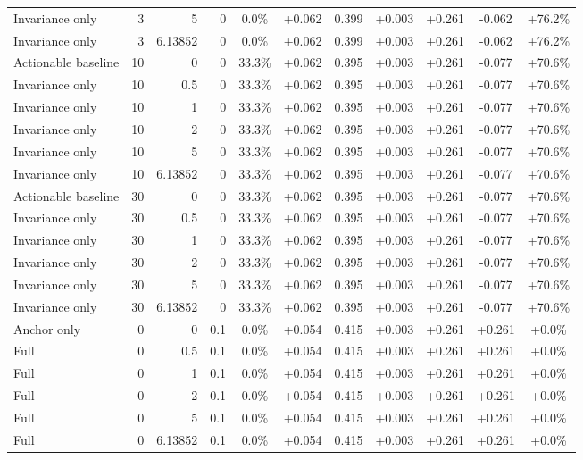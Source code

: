 \begin{table}[htbp]
\begin{tabular}{lrrrccccccc}
Invariance only & 3 & 5 & 0 & 0.0\% & +0.062 & 0.399 & +0.003 & +0.261 & -0.062 & +76.2\% \\
Invariance only & 3 & 6.13852 & 0 & 0.0\% & +0.062 & 0.399 & +0.003 & +0.261 & -0.062 & +76.2\% \\
Actionable baseline & 10 & 0 & 0 & 33.3\% & +0.062 & 0.395 & +0.003 & +0.261 & -0.077 & +70.6\% \\
Invariance only & 10 & 0.5 & 0 & 33.3\% & +0.062 & 0.395 & +0.003 & +0.261 & -0.077 & +70.6\% \\
Invariance only & 10 & 1 & 0 & 33.3\% & +0.062 & 0.395 & +0.003 & +0.261 & -0.077 & +70.6\% \\
Invariance only & 10 & 2 & 0 & 33.3\% & +0.062 & 0.395 & +0.003 & +0.261 & -0.077 & +70.6\% \\
Invariance only & 10 & 5 & 0 & 33.3\% & +0.062 & 0.395 & +0.003 & +0.261 & -0.077 & +70.6\% \\
Invariance only & 10 & 6.13852 & 0 & 33.3\% & +0.062 & 0.395 & +0.003 & +0.261 & -0.077 & +70.6\% \\
Actionable baseline & 30 & 0 & 0 & 33.3\% & +0.062 & 0.395 & +0.003 & +0.261 & -0.077 & +70.6\% \\
Invariance only & 30 & 0.5 & 0 & 33.3\% & +0.062 & 0.395 & +0.003 & +0.261 & -0.077 & +70.6\% \\
Invariance only & 30 & 1 & 0 & 33.3\% & +0.062 & 0.395 & +0.003 & +0.261 & -0.077 & +70.6\% \\
Invariance only & 30 & 2 & 0 & 33.3\% & +0.062 & 0.395 & +0.003 & +0.261 & -0.077 & +70.6\% \\
Invariance only & 30 & 5 & 0 & 33.3\% & +0.062 & 0.395 & +0.003 & +0.261 & -0.077 & +70.6\% \\
Invariance only & 30 & 6.13852 & 0 & 33.3\% & +0.062 & 0.395 & +0.003 & +0.261 & -0.077 & +70.6\% \\
Anchor only & 0 & 0 & 0.1 & 0.0\% & +0.054 & 0.415 & +0.003 & +0.261 & +0.261 & +0.0\% \\
Full & 0 & 0.5 & 0.1 & 0.0\% & +0.054 & 0.415 & +0.003 & +0.261 & +0.261 & +0.0\% \\
Full & 0 & 1 & 0.1 & 0.0\% & +0.054 & 0.415 & +0.003 & +0.261 & +0.261 & +0.0\% \\
Full & 0 & 2 & 0.1 & 0.0\% & +0.054 & 0.415 & +0.003 & +0.261 & +0.261 & +0.0\% \\
Full & 0 & 5 & 0.1 & 0.0\% & +0.054 & 0.415 & +0.003 & +0.261 & +0.261 & +0.0\% \\
Full & 0 & 6.13852 & 0.1 & 0.0\% & +0.054 & 0.415 & +0.003 & +0.261 & +0.261 & +0.0\% \\

\end{tabular}
\end{table}
